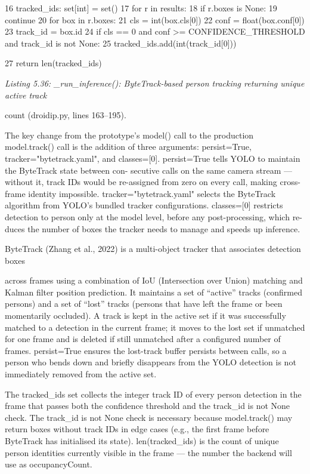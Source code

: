 16 tracked\_ids: set[int] = set()
17 for r in results:
18 if r.boxes is None:
19 continue
20 for box in r.boxes:
21 cls = int(box.cls[0])
22 conf = float(box.conf[0])
23 track\_id = box.id
24 if cls == 0 and conf >= CONFIDENCE\_THRESHOLD and track\_id is not None:
25 tracked\_ids.add(int(track\_id[0]))

27 return len(tracked\_ids)


\textit{Listing 5.36: \_run\_inference(): ByteTrack-based person tracking returning unique active track}

count (droidip.py, lines 163--195).



The key change from the prototype's model() call to the production model.track()
call is the addition of three arguments: persist=True, tracker="bytetrack.yaml", and
classes=[0]. persist=True tells YOLO to maintain the ByteTrack state between con-
secutive calls on the same camera stream --- without it, track IDs would be re-assigned from
zero on every call, making cross-frame identity impossible. tracker="bytetrack.yaml"
selects the ByteTrack algorithm from YOLO's bundled tracker conﬁgurations. classes=[0]
restricts detection to person only at the model level, before any post-processing, which re-
duces the number of boxes the tracker needs to manage and speeds up inference.

ByteTrack (Zhang et al., 2022) is a multi-object tracker that associates detection boxes



across frames using a combination of IoU (Intersection over Union) matching and Kalman
ﬁlter position prediction. It maintains a set of ``active'' tracks (conﬁrmed persons) and a set
of ``lost'' tracks (persons that have left the frame or been momentarily occluded). A track
is kept in the active set if it was successfully matched to a detection in the current frame;
it moves to the lost set if unmatched for one frame and is deleted if still unmatched after a
conﬁgured number of frames. persist=True ensures the lost-track buffer persists between
calls, so a person who bends down and brieﬂy disappears from the YOLO detection is not
immediately removed from the active set.

The tracked\_ids set collects the integer track ID of every person detection in the
frame that passes both the conﬁdence threshold and the track\_id is not None check.
The track\_id is not None check is necessary because model.track() may return boxes
without track IDs in edge cases (e.g., the ﬁrst frame before ByteTrack has initialised its
state). len(tracked\_ids) is the count of unique person identities currently visible in the
frame --- the number the backend will use as occupancyCount.



